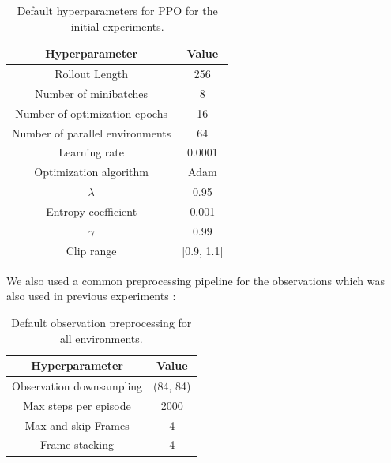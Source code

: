 \begin{table} [ht]
    \begin{center}
        \begin{tabular}{|c|c|}
            \hline
            Hyperparameter & Value \\
            \hline
            Rollout Length & 256 \\
            Number of minibatches & 8 \\
            Number of optimization epochs & 16 \\
            Number of parallel environments & 64 \\
            Learning rate & 0.0001 \\
            Optimization algorithm & Adam \cite{kingma2014adam} \\
            $\lambda$ & 0.95 \\
            Entropy coefficient & 0.001 \\
            $\gamma$ & 0.99 \\
            Clip range & [0.9, 1.1] \\
            \hline
        \end{tabular}
    \end{center}
    \caption[Default Hyperparameters]{Default hyperparameters for PPO for the initial experiments.} \label{tab:PPOHyperparemeters}
\end{table}

We also used a common preprocessing pipeline for the observations which was also used in previous experiments \cite{huang2019}:

\begin{table} [h]
    \begin{center}
        \begin{tabular}{|c|c|}
            \hline
            Hyperparameter & Value \\
            \hline
            Observation downsampling & (84, 84) \\
            Max steps per episode & 2000 \\
            Max and skip Frames & 4 \\
            Frame stacking & 4 \\
            \hline
        \end{tabular}
    \end{center}
    \caption[Default Observation Preprocessing]{Default observation preprocessing for all environments.} \label{tab:RNDPreprocessing}
\end{table}

